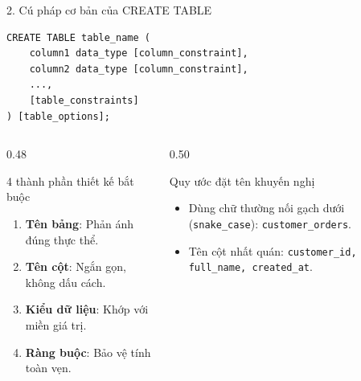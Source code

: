 \documentclass[aspectratio=169,11pt]{beamer}
\newcommand{\kw}[1]{\textcolor{dbblue}{\textbf{#1}}}
\newcommand{\smallgap}{\vspace{0.2em}}
\begin{document}
\begin{frame}[fragile]{2. Cú pháp cơ bản của CREATE TABLE}
\begin{lstlisting}
CREATE TABLE table_name (
    column1 data_type [column_constraint],
    column2 data_type [column_constraint],
    ...,
    [table_constraints]
) [table_options];
\end{lstlisting}

\smallgap
\begin{columns}[t]
  \begin{column}{0.48\textwidth}
    \begin{block}{4 thành phần thiết kế bắt buộc}
      \begin{enumerate}\setlength{\itemsep}{1.5pt}
        \item \kw{Tên bảng}: Phản ánh đúng thực thể.
        \item \kw{Tên cột}: Ngắn gọn, không dấu cách.
        \item \kw{Kiểu dữ liệu}: Khớp với miền giá trị.
        \item \kw{Ràng buộc}: Bảo vệ tính toàn vẹn.
      \end{enumerate}
    \end{block}
  \end{column}
  \begin{column}{0.50\textwidth}
    \begin{exampleblock}{Quy ước đặt tên khuyến nghị}
      \begin{itemize}\setlength{\itemsep}{1.5pt}
        \item Dùng chữ thường nối gạch dưới (\texttt{snake\_case}): \texttt{customer\_orders}.
        \item Tên cột nhất quán: \texttt{customer\_id, full\_name, created\_at}.
      \end{itemize}
    \end{exampleblock}
  \end{column}
\end{columns}
\end{frame}

\end{document}
